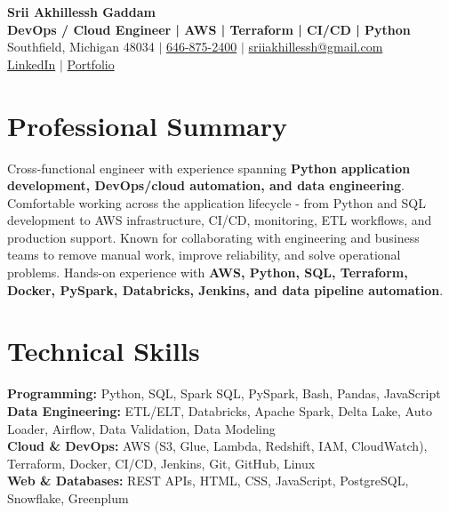 \documentclass[letterpaper,10pt]{article}
\begin{document}
\fontsize{9.35pt}{10.45pt}\selectfont

\begin{center}
    {\LARGE \textbf{Srii Akhillessh Gaddam}} \\[-1pt]
    \textbf{DevOps / Cloud Engineer | AWS | Terraform | CI/CD | Python} \\[2pt]
    Southfield, Michigan 48034 $|$
    \href{tel:6468752400}{646-875-2400} $|$
    \href{mailto:sriiakhillessh@gmail.com}{sriiakhillessh@gmail.com} \\[1pt]
    \href{https://www.linkedin.com/in/srii-akhiilessh-gaddam-b48668191/}{LinkedIn} $|$
    \href{https://sriiakhillesshg.github.io/portfolio/}{Portfolio}
\end{center}
\vspace{-8pt}

\section{Professional Summary}
\small{Cross-functional engineer with experience spanning \textbf{Python application development, DevOps/cloud automation, and data engineering}. Comfortable working across the application lifecycle - from Python and SQL development to AWS infrastructure, CI/CD, monitoring, ETL workflows, and production support. Known for collaborating with engineering and business teams to remove manual work, improve reliability, and solve operational problems. Hands-on experience with \textbf{AWS, Python, SQL, Terraform, Docker, PySpark, Databricks, Jenkins, and data pipeline automation}.}

\section{Technical Skills}
\small{
\textbf{Programming:} Python, SQL, Spark SQL, PySpark, Bash, Pandas, JavaScript \\
\textbf{Data Engineering:} ETL/ELT, Databricks, Apache Spark, Delta Lake, Auto Loader, Airflow, Data Validation, Data Modeling \\
\textbf{Cloud \& DevOps:} AWS (S3, Glue, Lambda, Redshift, IAM, CloudWatch), Terraform, Docker, CI/CD, Jenkins, Git, GitHub, Linux \\
\textbf{Web \& Databases:} REST APIs, HTML, CSS, JavaScript, PostgreSQL, Snowflake, Greenplum
}
\end{document}

